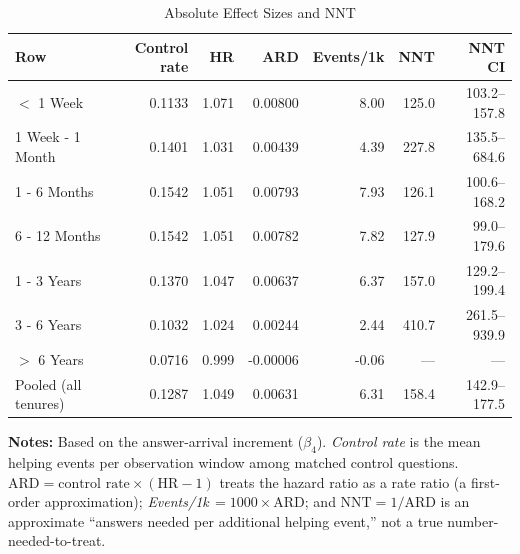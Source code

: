 \begin{table}[H]
\caption{Absolute Effect Sizes and NNT}
\label{tab:absolute_effects}
\centering
\footnotesize
\begin{tabular}{@{}lrrrrrr@{}}
\toprule
\textbf{Row} & \textbf{Control rate} & \textbf{HR} & \textbf{ARD} & \textbf{Events/1k} & \textbf{NNT} & \textbf{NNT CI} \\
\midrule
$<$ 1 Week & 0.1133 & 1.071 & 0.00800 & 8.00 & 125.0 & 103.2--157.8 \\
1 Week - 1 Month & 0.1401 & 1.031 & 0.00439 & 4.39 & 227.8 & 135.5--684.6 \\
1 - 6 Months & 0.1542 & 1.051 & 0.00793 & 7.93 & 126.1 & 100.6--168.2 \\
6 - 12 Months & 0.1542 & 1.051 & 0.00782 & 7.82 & 127.9 & 99.0--179.6 \\
1 - 3 Years & 0.1370 & 1.047 & 0.00637 & 6.37 & 157.0 & 129.2--199.4 \\
3 - 6 Years & 0.1032 & 1.024 & 0.00244 & 2.44 & 410.7 & 261.5--939.9 \\
$>$ 6 Years & 0.0716 & 0.999 & -0.00006 & -0.06 & — & — \\
Pooled (all tenures) & 0.1287 & 1.049 & 0.00631 & 6.31 & 158.4 & 142.9--177.5 \\
\bottomrule
\end{tabular}
\vspace{0.35em}
\begin{minipage}{\linewidth}
\footnotesize
\raggedright
\textbf{Notes:} Based on the answer-arrival increment ($\beta_4$). \emph{Control rate} is the mean helping events per observation window among matched control questions. $\mathrm{ARD}=\text{control rate}\times(\mathrm{HR}-1)$ treats the hazard ratio as a rate ratio (a first-order approximation); \emph{Events/1k}$\,=1000\times\mathrm{ARD}$; and $\mathrm{NNT}=1/\mathrm{ARD}$ is an approximate ``answers needed per additional helping event,'' not a true number-needed-to-treat.
\end{minipage}
\end{table}